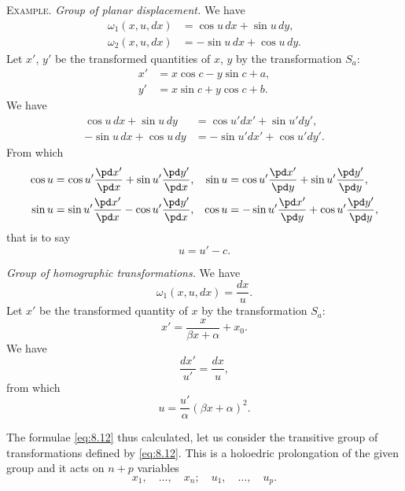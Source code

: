 {\small
\textsc{Example.} \emph{Group of planar displacement.} We have
\begin{align*}
  \omega_{1}(x,u,dx)&=\cos u\,dx+\sin u\,dy,\\
  \omega_{2}(x,u,dx)&=-\sin u\,dx+\cos u\,dy.
\end{align*}
Let $x'$, $y'$ be the transformed quantities of $x$, $y$ by the transformation $S_{a}$:
\begin{align*}
  x'&=x\cos c-y\sin c+a,\\
  y'&=x\sin c+y\cos c+ b.
\end{align*}
We have
\begin{align*}
  \cos u\,dx+\sin u\,dy&=\cos u'dx'+\sin u'dy',\\
  -\sin u\,dx+\cos u\,dy&=-\sin u'dx'+\cos u'dy'.
\end{align*}
From which
\begin{align*}
  \cos u&=\cos u'\frac{\pd x'}{\pd x}+\sin u'\frac{\pd y'}{\pd x},&\sin u&=\cos u'\frac{\pd x'}{\pd y}+\sin u'\frac{\pd y'}{\pd y},\\
  \sin u&=\sin u'\frac{\pd x'}{\pd x}-\cos u'\frac{\pd y'}{\pd x},&\cos u&=-\sin u'\frac{\pd x'}{\pd y}+\cos u'\frac{\pd y'}{\pd y},
\end{align*}
that is to say
\[
u=u'-c.
\]

\somespace

\emph{Group of homographic transformations.} We have
\[
\omega_{1}(x,u,dx)=\frac{dx}{u}.
\]
Let $x'$ be the transformed quantity of $x$ by the transformation $S_{a}$:
\[
x'=\frac{x}{\beta x+\alpha}+x_{0}.
\]
We have
\[
\frac{dx'}{u'}=\frac{dx}{u},
\]
from which
\[
u=\frac{u'}{\alpha}(\beta x+\alpha)^{2}.
\]
\somespace
}

The formulae \eqref{eq:8.12} thus calculated, let us consider the transitive group of transformations defined by \eqref{eq:8.12}. This is a holoedric prolongation of the given group and it acts on $n+p$ variables
\[
x_{1},\quad \dots,\quad x_{n};\quad u_{1},\quad \dots,\quad u_{p}.
\]

